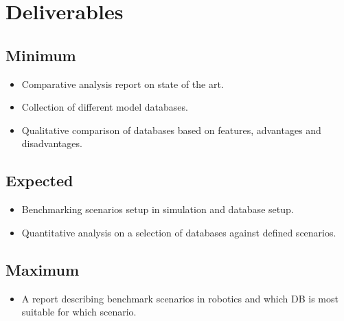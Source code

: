 \documentclass[12pt]{article}
\begin{document}
\section{Deliverables}
\subsection{Minimum}
\begin{itemize}
\item Comparative analysis report on state of the art.
\item Collection of different model databases.
\item Qualitative comparison of databases based on features, advantages and disadvantages.
\end{itemize}
\subsection{Expected}
\begin{itemize}
\item Benchmarking scenarios setup in simulation and database setup.
\item Quantitative analysis on a selection of databases against defined scenarios.
\end{itemize}
\subsection{Maximum}
\begin{itemize}
\item A report describing benchmark scenarios in robotics and which DB is most suitable for which scenario.
\end{itemize}
\end{document}
